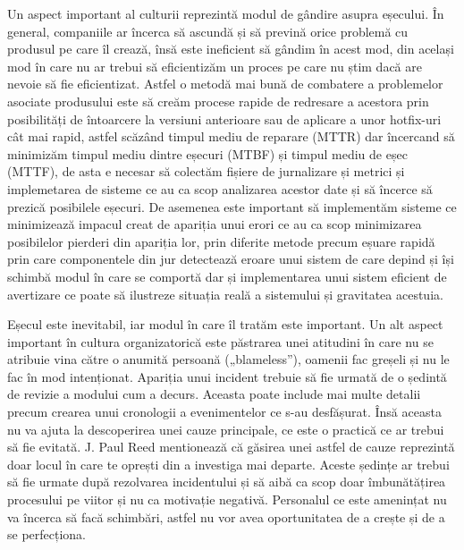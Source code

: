 Un aspect important al culturii reprezintă modul de gândire asupra eșecului.
În general, companiile ar încerca să ascundă și să prevină orice problemă cu
produsul pe care îl crează, însă este ineficient să gândim în acest mod, din același
mod în care nu ar trebui să eficientizăm un proces pe care nu știm dacă are nevoie să
fie eficientizat. Astfel o metodă mai bună de combatere a problemelor asociate
produsului este să creăm procese rapide de redresare a acestora prin posibilități
de întoarcere la versiuni anterioare sau de aplicare a unor hotfix-uri cât mai rapid, astfel scăzând
timpul mediu de reparare (MTTR) dar încercand să minimizăm timpul mediu dintre eșecuri (MTBF)
și timpul mediu de eșec (MTTF), de asta e necesar să colectăm fișiere de jurnalizare
și metrici și implemetarea de sisteme ce au ca scop analizarea acestor date
și să încerce să prezică posibilele eșecuri. De asemenea este important să
implementăm sisteme ce minimizează impacul creat de apariția unui erori ce au ca scop
minimizarea posibilelor pierderi din apariția lor, prin diferite
metode precum eșuare rapidă prin care componentele din jur detectează eroare unui sistem
de care depind și își schimbă modul în care se comportă dar și implementarea
unui sistem eficient de avertizare ce poate să ilustreze situația reală a sistemului
și gravitatea acestuia.

Eșecul este inevitabil, iar modul în care îl tratăm este important. Un alt aspect important
în cultura organizatorică este păstrarea unei atitudini în care nu se atribuie vina către
o anumită persoană („blameless”), oamenii fac greșeli și nu le fac în mod intenționat.
Apariția unui incident trebuie să fie urmată de o ședintă de revizie a modului
cum a decurs. Aceasta poate include mai multe detalii precum crearea unui cronologii
a evenimentelor ce s-au desfășurat. Însă aceasta nu va ajuta la descoperirea unei cauze
principale, ce este o practică ce ar trebui să fie evitată. J. Paul Reed mentionează
că găsirea unei astfel de cauze reprezintă doar locul în care te oprești din a investiga mai departe.
Aceste ședințe ar trebui să fie urmate după rezolvarea incidentului și să aibă ca scop
doar îmbunătățirea procesului pe viitor și nu ca motivație negativă. Personalul
ce este amenințat nu va încerca să facă schimbări, astfel nu vor avea oportunitatea de a
crește și de a se perfecționa.

